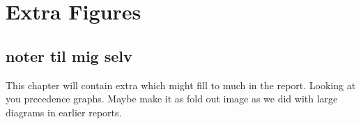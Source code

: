 \chapter{Extra Figures}
\color{gray}
\section*{noter til mig selv}
This chapter will contain extra which might fill to much in the report. Looking at you precedence graphs.
Maybe make it as fold out image as we did with large diagrams in earlier reports.
\color{black} 
